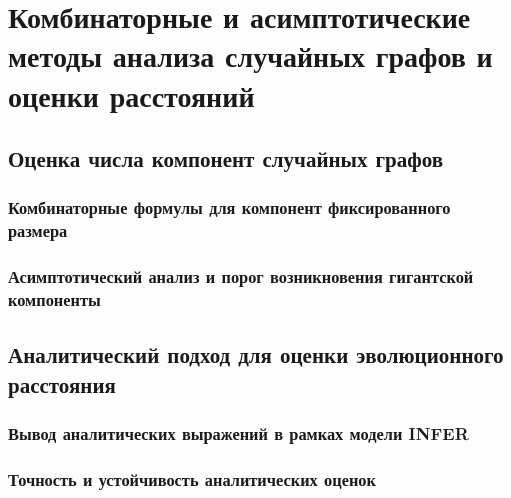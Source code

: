 \chapter{Комбинаторные и асимптотические методы анализа случайных графов и оценки расстояний}
\label{chap:graph_analysis}

\section{Оценка числа компонент случайных графов}
\label{sec:component_count_estimation}

\subsection{Комбинаторные формулы для компонент фиксированного размера}
\label{subsec:fixed_size_components}

\subsection{Асимптотический анализ и порог возникновения гигантской компоненты}
\label{subsec:giant_component_threshold}

\section{Аналитический подход для оценки эволюционного расстояния}
\label{sec:analytical_distance_estimation}

\subsection{Вывод аналитических выражений в рамках модели INFER}
\label{subsec:infer_model_analytics}

\subsection{Точность и устойчивость аналитических оценок}
\label{subsec:analytics_accuracy}
